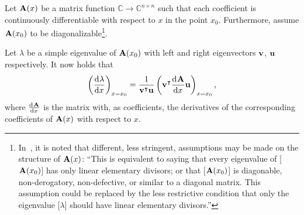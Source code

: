 \begin{theorem}[Lancaster 1964]\label{the:c3_eigenvalue_derivative}
  Let $\vb{A}(x)$ be a matrix function $\mathbb{C} \to \mathbb{C}^{n\times n}$ such that each coefficient is continuously differentiable with respect to $x$ in the point $x_0$. Furthermore, assume $\vb{A}(x_0)$ to be diagonalizable\footnote{In~\cite{lancaster_eigenvalues_1964}, it is noted that different, less stringent, assumptions may be made on the structure of $\vb{A}(x)$: ``This is equivalent to saying that every eigenvalue of [$\vb{A}(x_0)$] has only linear elementary divisors; or that [$\vb{A}(x_0)$] is diagonable, non-derogatory, non-defective, or similar to a diagonal matrix. This assumption could be replaced by the less restrictive condition that only the eigenvalue [$\lambda$] should have linear elementary divisors.''}.

  Let $\lambda$ be a simple eigenvalue of $\vb{A}(x_0)$ with left and right eigenvectors $\vb{v}$, $\vb{u}$ respectively. It now holds that
  $$
    \left(\dv[]{\lambda}{x}\right)_{x=x_0} = \frac{1}{{\vb{v}}^\intercal\vb{u}} \left({\vb{v}}^\intercal\dv[]{\vb{A}}{x} \vb{u} \right)_{x=x_0}\text{,}
  $$
  where $\dv[]{\vb{A}}{x}$ is the matrix with, as coefficients, the derivatives of the corresponding coefficients of $\vb{A}(x)$ with respect to $x$.
\end{theorem}
